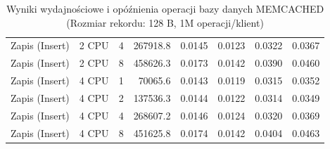 \begin{table}[ht]
{\begin{tabular}{llcrrrrr}
Zapis (Insert) & 2 CPU & 4 & 267918.8 & 0.0145 & 0.0123 & 0.0322 & 0.0367 \\
Zapis (Insert) & 2 CPU & 8 & 458626.3 & 0.0173 & 0.0142 & 0.0390 & 0.0460 \\
Zapis (Insert) & 4 CPU & 1 & 70065.6 & 0.0143 & 0.0119 & 0.0315 & 0.0352 \\
Zapis (Insert) & 4 CPU & 2 & 137536.3 & 0.0144 & 0.0122 & 0.0314 & 0.0349 \\
Zapis (Insert) & 4 CPU & 4 & 268607.2 & 0.0146 & 0.0124 & 0.0320 & 0.0369 \\
Zapis (Insert) & 4 CPU & 8 & 451625.8 & 0.0174 & 0.0142 & 0.0404 & 0.0463 \\
\bottomrule
\end{tabular}%
}
\caption{Wyniki wydajnościowe i opóźnienia operacji bazy danych MEMCACHED (Rozmiar rekordu: 128 B, 1M operacji/klient)}
\label{tab:latency_memcached_small_1000000}
\end{table}

